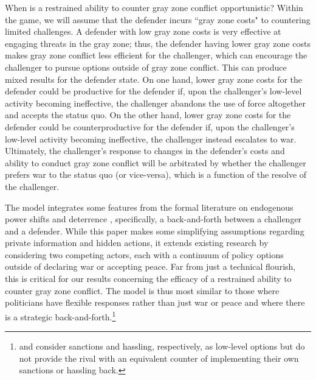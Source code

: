 \documentclass[bibtex, autowc]{apsr_submission}
\begin{document}
When is a restrained ability to counter gray zone conflict opportunistic? Within the game, we will assume that the defender incurs ``gray zone costs" to countering limited challenges. A defender with low gray zone costs is very effective at engaging threats in the gray zone; thus, the defender having lower gray zone costs makes gray zone conflict less efficient for the challenger, which can encourage the challenger to pursue options outside of gray zone conflict. This can produce mixed results for the defender state. On one hand, lower gray zone costs for the defender could be productive for the defender if, upon the challenger's low-level activity becoming ineffective, the challenger abandons the use of force altogether and accepts the status quo. On the other hand, lower gray zone costs for the defender could be counterproductive for the defender if, upon the challenger's low-level activity becoming ineffective, the challenger instead escalates to war. Ultimately, the challenger's response to changes in the defender's costs and ability to conduct gray zone conflict will be arbitrated by whether the challenger prefers war to the status quo (or vice-versa), which is a function of the resolve of the challenger.

The model integrates some features from the formal literature on endogenous power shifts and deterrence \citep{fearon_signalingforeignpolicy_1997, debs_knownunknownspower_2014, gurantz_fearappeasementeffectiveness_2017, baliga_deterrenceimperfectattribution_2020}, specifically, a back-and-forth between a challenger and a defender. While this paper makes some simplifying assumptions regarding private information and hidden actions, it extends existing research by considering two competing actors, each with a continuum of policy options outside of declaring war or accepting peace. Far from just a technical flourish, this is critical for our results concerning the efficacy of a restrained ability to counter gray zone conflict. The model is thus most similar to those where politicians have flexible responses rather than just war or peace \citep{schultz2010enforcement, powell_nuclearbrinkmanshiplimited_2015, mccormack_sanctionspreventivewar_2017, coe_containingroguestheory_2018, smith_militarizeddisputesuncertainty_2019,spaniel2019bargaining, joseph_littlebitcheaptalk_2020, schram_hasslinghowstates_2020} and where there is a strategic back-and-forth.\footnote{\citet{mccormack_sanctionspreventivewar_2017} and \citet{schram_hasslinghowstates_2020} consider sanctions and hassling, respectively, as low-level options but do not provide the rival with an equivalent counter of implementing their own sanctions or hassling back.}
\end{document}
